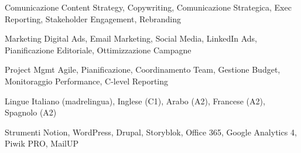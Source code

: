 
\begin{cvskills}

\cvskill
{Comunicazione} %
{Content Strategy, Copywriting, Comunicazione Strategica, Exec Reporting, Stakeholder Engagement, Rebranding} %

\cvskill
{Marketing} %
{Digital Ads, Email Marketing, Social Media, LinkedIn Ads, Pianificazione Editoriale, Ottimizzazione Campagne} %

\cvskill
{Project Mgmt} %
{Agile, Pianificazione, Coordinamento Team, Gestione Budget, Monitoraggio Performance, C-level Reporting} %

\cvskill
{Lingue} %
{Italiano (madrelingua), Inglese (C1), Arabo (A2), Francese (A2), Spagnolo (A2)} %

\cvskill
{Strumenti} %
{Notion, WordPress, Drupal, Storyblok, Office 365, Google Analytics 4, Piwik PRO, MailUP} %

\end{cvskills}
